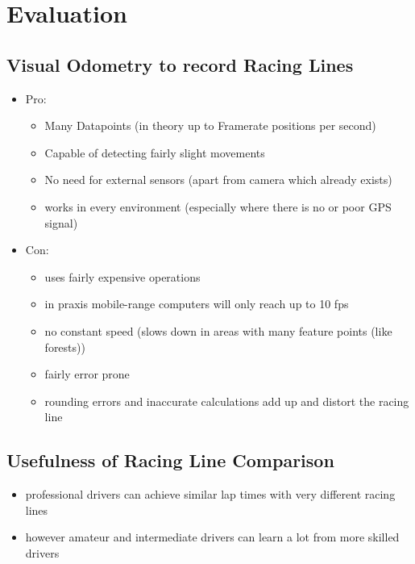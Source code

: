 \section{Evaluation}
\label{sec:evaluation}

\subsection{Visual Odometry to record Racing Lines}
\begin{itemize}
\item Pro: 
  \begin{itemize}
  \item Many Datapoints (in theory up to Framerate positions per second)
  \item Capable of detecting fairly slight movements
  \item No need for external sensors (apart from camera which already exists)
  \item works in every environment (especially where there is no or poor GPS signal)
  \end{itemize}

\item Con:
  \begin{itemize}
  \item uses fairly expensive operations
  \item in praxis mobile-range computers will only reach up to 10 fps
  \item no constant speed (slows down in areas with many feature points (like forests))
  \item fairly error prone
  \item rounding errors and inaccurate calculations add up and distort the racing line
  \end{itemize}
\end{itemize}
\subsection{Usefulness of Racing Line Comparison}
\begin{itemize}
  \item professional drivers can achieve similar lap times with very different racing lines
  \item however amateur and intermediate drivers can learn a lot from more skilled drivers
\end{itemize}


\clearpage
